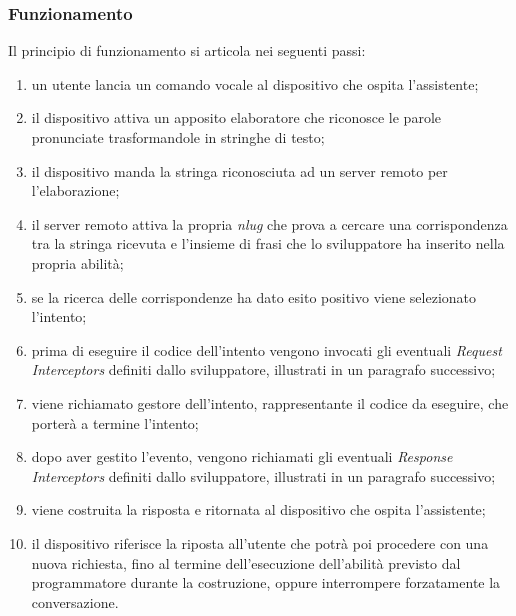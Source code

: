 		\subsubsection{Funzionamento}
		Il principio di funzionamento si articola nei seguenti passi:
		\begin{enumerate}
			\item un utente lancia un comando vocale al dispositivo che ospita l'assistente;
			\item il dispositivo attiva un apposito elaboratore che riconosce le parole pronunciate trasformandole in stringhe di testo;
			\item il dispositivo manda la stringa riconosciuta ad un server remoto per l'elaborazione;
			\item il server remoto attiva la propria \emph{\gls{nlug}} che prova a cercare una corrispondenza tra la stringa ricevuta e l'insieme di frasi che lo sviluppatore ha inserito nella propria abilità;
			\item se la ricerca delle corrispondenze ha dato esito positivo viene selezionato l'intento;
			\item prima di eseguire il codice dell'intento vengono invocati gli eventuali \emph{Request Interceptors} definiti dallo sviluppatore, illustrati in un paragrafo successivo;
			\item viene richiamato gestore dell'intento, rappresentante il codice da eseguire, che porterà a termine l'intento;
			\item dopo aver gestito l'evento, vengono richiamati gli eventuali \emph{Response Interceptors} definiti dallo sviluppatore, illustrati in un paragrafo successivo;
			\item viene costruita la risposta e ritornata al dispositivo che ospita l'assistente;
			\item il dispositivo riferisce la riposta all'utente che potrà poi procedere con una nuova richiesta, fino al termine dell'esecuzione dell'abilità previsto dal programmatore durante la costruzione, oppure interrompere forzatamente la conversazione.
		\end{enumerate}
